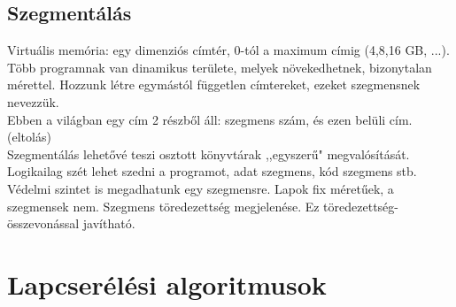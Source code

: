 \documentclass[margin=0px]{article}
\begin{document}
	\subsection{Szegmentálás}
	
	Virtuális memória: egy dimenziós címtér, 0-tól a maximum címig (4,8,16 GB, ...). \\
	Több programnak van dinamikus területe, melyek növekedhetnek, bizonytalan mérettel. Hozzunk létre egymástól független címtereket, ezeket szegmensnek nevezzük. \\
	Ebben a világban egy cím 2 részből áll: szegmens szám, és ezen belüli cím. (eltolás) \\
	Szegmentálás lehetővé teszi osztott könyvtárak ,,egyszerű" megvalósítását. Logikailag szét lehet szedni a programot, adat szegmens, kód szegmens stb. Védelmi szintet is megadhatunk egy szegmensre. Lapok fix méretűek, a szegmensek nem. Szegmens töredezettség megjelenése. Ez töredezettség-összevonással javítható.
	
	\section{Lapcserélési algoritmusok}
	
\end{document}
